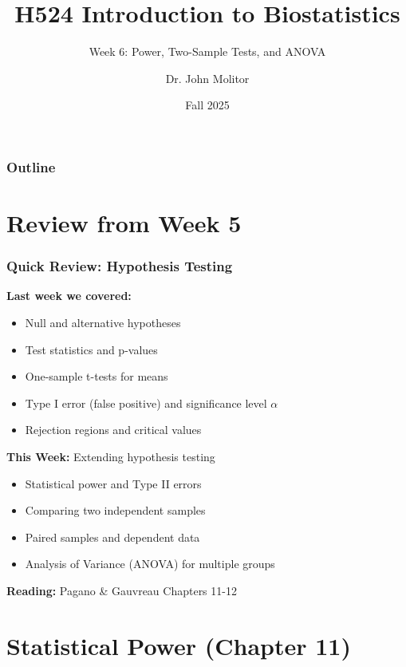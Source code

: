 \documentclass{beamer}
\title{H524 Introduction to Biostatistics}
\subtitle{Week 6: Power, Two-Sample Tests, and ANOVA}
\author{Dr. John Molitor}
\institute{}
\date{Fall 2025}
\begin{document}
\frame{\titlepage}

\begin{frame}
\frametitle{Outline}
\tableofcontents
\end{frame}

\section{Review from Week 5}

\begin{frame}
\frametitle{Quick Review: Hypothesis Testing}
\textbf{Last week we covered:}
\begin{itemize}
\item Null and alternative hypotheses
\item Test statistics and p-values
\item One-sample t-tests for means
\item Type I error (false positive) and significance level $\alpha$
\item Rejection regions and critical values
\end{itemize}

\vspace{0.5cm}
\textbf{This Week:} Extending hypothesis testing
\begin{itemize}
\item Statistical power and Type II errors
\item Comparing two independent samples
\item Paired samples and dependent data
\item Analysis of Variance (ANOVA) for multiple groups
\end{itemize}

\vspace{0.3cm}
\textbf{Reading:} Pagano \& Gauvreau Chapters 11-12
\end{frame}

\section{Statistical Power (Chapter 11)}
\end{document}
